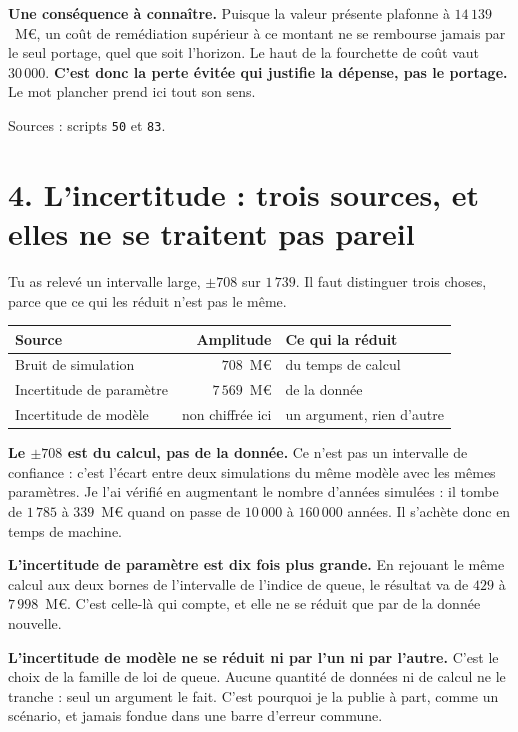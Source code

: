 \documentclass[11pt,a4paper]{article}
\begin{document}
\textbf{Une conséquence à connaître.} Puisque la valeur présente plafonne à $14\,139$~M\euro, un
coût de remédiation supérieur à ce montant ne se rembourse jamais par le seul portage, quel que
soit l'horizon. Le haut de la fourchette de coût vaut $30\,000$. \textbf{C'est donc la perte
évitée qui justifie la dépense, pas le portage.} Le mot \og plancher \fg{} prend ici tout son sens.

\medskip
{\small Sources : scripts \texttt{50} et \texttt{83}.}

\section*{4. L'incertitude : trois sources, et elles ne se traitent pas pareil}

Tu as relevé un intervalle large, $\pm 708$ sur $1\,739$. Il faut distinguer trois choses, parce
que ce qui les réduit n'est pas le même.

\begin{center}
\begin{tabular}{@{}l r l@{}}
\toprule
\textbf{Source} & \textbf{Amplitude} & \textbf{Ce qui la réduit} \\
\midrule
Bruit de simulation & $708$~M\euro & du temps de calcul \\
Incertitude de paramètre & $7\,569$~M\euro & de la donnée \\
Incertitude de modèle & non chiffrée ici & un argument, rien d'autre \\
\bottomrule
\end{tabular}
\end{center}

\textbf{Le $\pm 708$ est du calcul, pas de la donnée.} Ce n'est pas un intervalle de confiance :
c'est l'écart entre deux simulations du même modèle avec les mêmes paramètres. Je l'ai vérifié en
augmentant le nombre d'années simulées : il tombe de $1\,785$ à $339$~M\euro{} quand on passe de
$10\,000$ à $160\,000$ années. Il s'achète donc en temps de machine.

\textbf{L'incertitude de paramètre est dix fois plus grande.} En rejouant le même calcul aux deux
bornes de l'intervalle de l'indice de queue, le résultat va de $429$ à $7\,998$~M\euro. C'est
celle-là qui compte, et elle ne se réduit que par de la donnée nouvelle.

\textbf{L'incertitude de modèle ne se réduit ni par l'un ni par l'autre.} C'est le choix de la
famille de loi de queue. Aucune quantité de données ni de calcul ne le tranche : seul un argument
le fait. C'est pourquoi je la publie à part, comme un scénario, et jamais fondue dans une barre
d'erreur commune.
\end{document}
